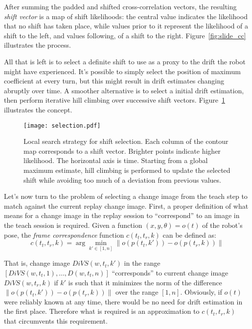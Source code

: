 \documentclass[twocolumn, 9pt,fleqn]{jsproceedings}
\begin{document}
After summing the padded and shifted cross-correlation vectors, the resulting \textit{shift vector} is a map of shift likelihoods: the central value indicates the likelihood that no shift has taken place, while values prior to it represent the likelihood of a shift to the left, and values following, of a shift to the right. Figure~\ref{fig:slide_cc} illustrates the process.

All that is left is to select a definite shift to use as a proxy to the drift the robot might have experienced. It's possible to simply select the position of maximum coefficient at every turn, but this might result in drift estimates changing abruptly over time. A smoother alternative is to select a initial drift estimation, then perform iterative hill climbing over successive shift vectors. Figure~\ref{fig:selection} illustrates the concept.

\begin{figure}[h!]
\texttt{[image: selection.pdf]}
\caption{Local search strategy for shift selection. Each column of the contour map corresponds to a shift vector. Brighter points indicate higher likelihood. The horizontal axis is time. Starting from a global maximum estimate, hill climbing is performed to update the selected shift while avoiding too much of a deviation from previous values.}
\label{fig:selection}
\end{figure}

Let's now turn to the problem of selecting a change image from the teach step to match against the current replay change image. First, a proper definition of what means for a change image in the replay session to ``correspond'' to an image in the teach session is required. Given a function $(x, y, \theta) = o(t)$ of the robot's pose, the \textit{frame correspondence} function $c(t_t, t_r, k)$ can be defined as:
\begin{equation}
c(t_t, t_r, k) = \arg \min_{k' \in [1, n]} {\| o(p(t_t, k')) - o(p(t_r, k)) \|}
\end{equation}

That is, change image $DiVS(w, t_t, k')$ in the range $[DiVS(w, t_t, 1), \dotsc, D(w, t_t, n)]$ ``corresponds'' to current change image $DiVS(w, t_r, k)$ if $k'$ is such that it minimizes the norm of the difference $\| o(p(t_t, k')) - o(p(t_r, k)) \|$ over the range $[1, n]$. Obviously, if $o(t)$ were reliably known at any time, there would be no need for drift estimation in the first place. Therefore what is required is an approximation to $c(t_t, t_r, k)$ that circumvents this requirement.
\end{document}
